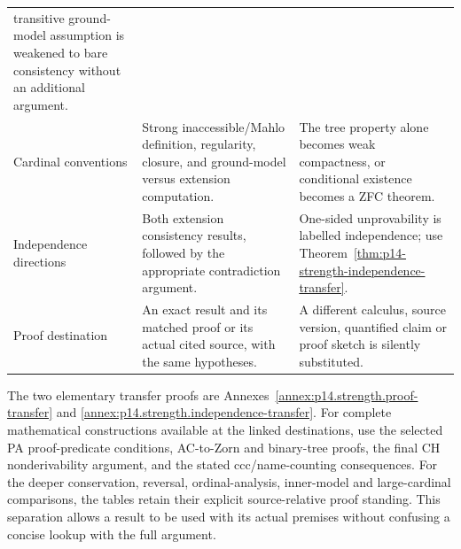 \begin{longtable}{@{}p{}p{}p{}@{}}
transitive ground-model assumption is weakened to bare consistency without
an additional argument. \\
\addlinespace
Cardinal conventions & Strong inaccessible/Mahlo definition, regularity,
closure, and ground-model versus extension computation. & The tree property
alone becomes weak compactness, or conditional existence becomes a ZFC theorem. \\
\addlinespace
Independence directions & Both extension consistency results, followed by
the appropriate contradiction argument. & One-sided unprovability is labelled
independence; use Theorem~\ref{thm:p14-strength-independence-transfer}. \\
\addlinespace
Proof destination & An exact result and its matched proof or its actual
cited source, with the same hypotheses. & A different calculus, source
version, quantified claim or proof sketch is silently substituted. \\
\bottomrule
\end{longtable}
\endgroup

The two elementary transfer proofs are
Annexes~\ref{annex:p14.strength.proof-transfer} and
\ref{annex:p14.strength.independence-transfer}. For complete mathematical
constructions available at the linked destinations, use the selected PA
proof-predicate conditions, AC-to-Zorn and binary-tree proofs, the final CH
nonderivability argument, and the stated ccc/name-counting consequences.
For the deeper conservation, reversal, ordinal-analysis, inner-model and
large-cardinal comparisons, the tables retain their explicit source-relative
proof standing. This separation allows a result to be used with its actual
premises without confusing a concise lookup with the full argument.
